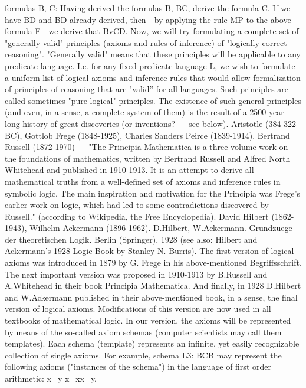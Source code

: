 formulas B, C:
Having derived the formulas B, B\IMPLIES C, derive the formula C.
If we have B\IMPLIES D and B\IMPLIES D already derived, then---by applying the rule MP to the above formula F---we
derive that BvC\IMPLIES D.
Now, we will try formulating a complete set of "generally valid" principles (axioms and rules of
inference) of "logically correct reasoning". "Generally valid" means that these principles will be
applicable to any predicate language. I.e. for any fixed predicate language L, we wish to formulate a
uniform list of logical axioms and inference rules that would allow formalization of principles of
reasoning that are "valid'' for all languages. Such principles are called sometimes "pure logical"
principles. The existence of such general principles (and even, in a sense, a complete system of them) is
the result of a 2500 year long history of great discoveries (or inventions? --- see below).
Aristotle (384-322 BC), Gottlob Frege (1848-1925), Charles Sanders Peirce (1839-1914).
Bertrand Russell (1872-1970) --- "The Principia Mathematica is a three-volume work on the foundations of mathematics,
written by Bertrand Russell and Alfred North Whitehead and published in 1910-1913. It is an attempt to derive all
mathematical truths from a well-defined set of axioms and inference rules in symbolic logic. The main inspiration and
motivation for the Principia was Frege's earlier work on logic, which had led to some contradictions discovered by Russell."
(according to Wikipedia, the Free Encyclopedia).
David Hilbert (1862-1943), Wilhelm Ackermann (1896-1962).
D.Hilbert, W.Ackermann. Grundzuege der theoretischen Logik. Berlin (Springer), 1928 (see also: Hilbert and Ackermann's
1928 Logic Book by Stanley N. Burris).
The first version of logical axioms was introduced in 1879 by G. Frege in his above-mentioned
Begriffsschrift. The next important version was proposed in 1910-1913 by B.Russell and A.Whitehead in
their book Principia Mathematica. And finally, in 1928 D.Hilbert and W.Ackermann published in their
above-mentioned book, in a sense, the final version of logical axioms. Modifications of this version are
now used in all textbooks of mathematical logic.
In our version, the axioms will be represented by means of the so-called axiom schemas (computer
scientists may call them templates). Each schema (template) represents an infinite, yet easily recognizable
collection of single axioms. For example, schema L3: B\AND C\IMPLIES B may represent the following axioms
("instances of the schema") in the language of first order arithmetic:
x=y \AND  x=x\IMPLIES x=y,
